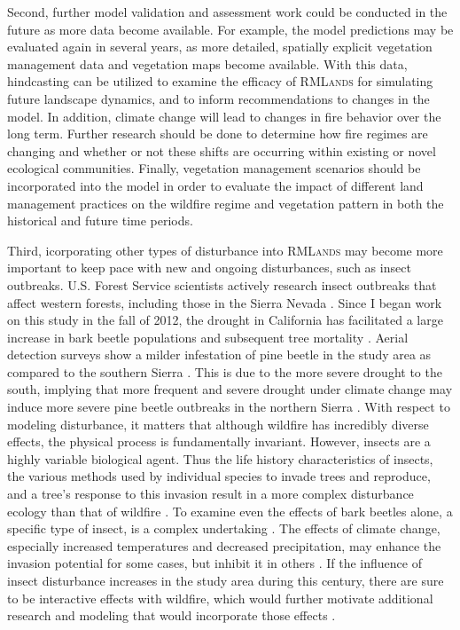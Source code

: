 Second, further model validation and assessment work could be conducted in the future as more data become available. For example, the model predictions may be evaluated again in several years, as more detailed, spatially explicit vegetation management data and vegetation maps become available. With this data, hindcasting can be utilized to examine the efficacy of \textsc{RMLands} for simulating future landscape dynamics, and to inform recommendations to changes in the model. In addition, climate change will lead to changes in fire behavior over the long term. Further research should be done to determine how fire regimes are changing and whether or not these shifts are occurring within existing or novel ecological communities. Finally, vegetation management scenarios should be incorporated into the model in order to evaluate the impact of different land management practices on the wildfire regime and vegetation pattern in both the historical and future time periods.

Third, icorporating other types of disturbance into \textsc{RMLands} may become more important to keep pace with new and ongoing disturbances, such as insect outbreaks. U.S. Forest Service scientists actively research insect outbreaks that affect western forests, including those in the Sierra Nevada \citep{Liebhold2011}. Since I began work on this study in the fall of 2012, the drought in California has facilitated a large increase in bark beetle populations and subsequent tree mortality \citep{Fimrite2016}. Aerial detection surveys show a milder infestation of pine beetle in the study area as compared to  the southern Sierra \citep{Moore2015a,Moore2015b}. This is due to the more severe  drought to the south, implying that more frequent and severe drought under climate change may induce more severe pine beetle outbreaks in the northern Sierra \citep{Moore2015a,Moore2015b,Fimrite2016}. With respect to modeling disturbance, it matters that although wildfire has incredibly diverse effects, the physical process is fundamentally invariant. However, insects are a highly variable biological agent. Thus the life history characteristics of insects, the various methods used by individual species to invade trees and reproduce, and a tree's response to this invasion result in a more complex disturbance ecology than that of wildfire \citep{Bentz2010}. To examine even the effects of bark beetles alone, a specific type of insect, is a complex undertaking \citep{Fettig2007}. The effects of climate change, especially increased temperatures and decreased precipitation, may enhance the invasion potential for some cases, but inhibit it in others \citep{Logan2003,Bentz2010}. If the influence of insect disturbance increases in the study area during this century, there are sure to be interactive effects with wildfire, which would further motivate additional research and modeling that would incorporate those effects \citep{Ferrell1996}.





